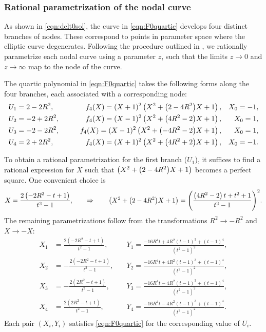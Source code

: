\documentclass[11pt, a4paper]{article}
\numberwithin{equation}{section}
\begin{document}
\subsubsection{Rational parametrization of the nodal curve}

As shown in \cref{eqn:delt0sol}, the curve in \cref{eqn:F0quartic} develops four distinct branches of nodes. These correspond to points in parameter space where the elliptic curve degenerates. Following the procedure outlined in \cite{kerr2008}, we rationally parametrize each nodal curve using a parameter $z$, such that the limits $z \to 0$ and $z \to \infty$ map to the node of the curve.

The quartic polynomial in \cref{eqn:F0quartic} takes the following forms along the four branches, each associated with a corresponding node:
\begin{equation}
  \begin{aligned}
    U_1 &= 2 - 2R^2, &\qquad f_4(X) = (X+1)^2 \left(X^2 + \qty(2-4 R^2) X+1\right), && X_0 = -1, \\
    U_2 &= -2 + 2R^2, &\qquad f_4(X) = (X-1)^2 \left(X^2 + \qty(4 R^2-2) X+1\right), && X_0 = 1, \\
    U_3 &= -2 - 2R^2, &\qquad f_4(X) = (X-1)^2 \left(X^2+ \qty(-4 R^2-2) X+1\right), && X_0 = 1, \\
    U_4 &= 2 + 2 R^2, &\qquad f_4(X) = (X+1)^2 \left(X^2+\qty(4 R^2+2) X+1\right), && X_0 = -1.
  \end{aligned}
\end{equation}

To obtain a rational parametrization for the first branch ($U_1$), it suffices to find a rational expression for $X$ such that $\left(X^2 + \qty(2-4 R^2) X+1\right)$ becomes a perfect square. One convenient choice is
\begin{equation}
  X = \frac{2 \left(-2 R^2-t+1\right)}{t^2-1},
  \qquad
  \Rightarrow \qquad
  \left(X^2 + \qty(2-4 R^2) X+1\right) = 
  \qty(\frac{\left(4 R^2-2\right) t+t^2+1}{t^2-1})^2.
\end{equation}
The remaining parametrizations follow from the transformations $R^2 \to -R^2$ and $X \to -X$:
\begin{equation}
\begin{aligned}
  X_1 &= \frac{2 \left(-2 R^2-t+1\right)}{t^2-1}, &\quad
  Y_1 = \frac{-16 R^4 t+4 R^2 (t-1)^3+(t-1)^4}{\left(t^2-1\right)^2}, \\
  X_2 &= -\frac{2 \left(-2 R^2-t+1\right)}{t^2-1}, &\quad
  Y_2 = \frac{-16 R^4 t+4 R^2 (t-1)^3+(t-1)^4}{\left(t^2-1\right)^2}, \\
  X_3 &= -\frac{2 \left(2 R^2-t+1\right)}{t^2-1}, &\quad
  Y_3 = \frac{-16 R^4 t-4 R^2 (t-1)^3+(t-1)^4}{\left(t^2-1\right)^2}, \\
  X_4 &= \frac{2 \left(2 R^2-t+1\right)}{t^2-1}, &\quad
  Y_4 = \frac{-16 R^4 t-4 R^2 (t-1)^3+(t-1)^4}{\left(t^2-1\right)^2}.
\end{aligned}
\end{equation}
Each pair $(X_i, Y_i)$ satisfies \cref{eqn:F0quartic} for the corresponding value of $U_i$.
\end{document}
